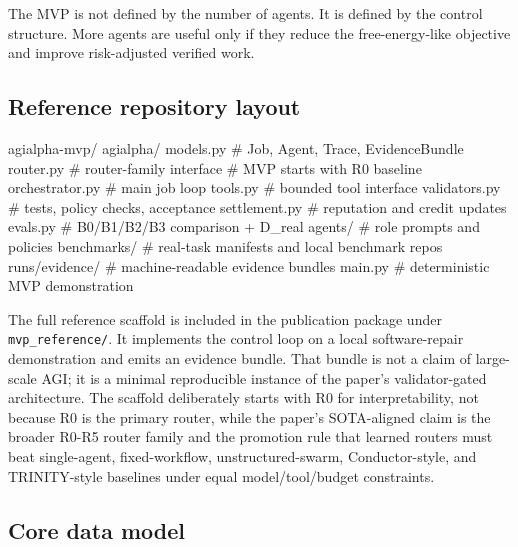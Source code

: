 \documentclass[
  11pt,
]{article}
\newenvironment{Shaded}{}{}
\newcommand{\NormalTok}[1]{#1}
\begin{document}
The MVP is not defined by the number of agents. It is defined by the
control structure. More agents are useful only if they reduce the
free-energy-like objective and improve risk-adjusted verified work.

\subsection{Reference repository
layout}\label{reference-repository-layout}

\begin{Shaded}
\begin{Highlighting}[]
\NormalTok{agialpha{-}mvp/}
\NormalTok{  agialpha/}
\NormalTok{    models.py          \# Job, Agent, Trace, EvidenceBundle}
\NormalTok{    router.py          \# router{-}family interface}
\NormalTok{                       \# MVP starts with R0 baseline}
\NormalTok{    orchestrator.py    \# main job loop}
\NormalTok{    tools.py           \# bounded tool interface}
\NormalTok{    validators.py      \# tests, policy checks, acceptance}
\NormalTok{    settlement.py      \# reputation and credit updates}
\NormalTok{    evals.py           \# B0/B1/B2/B3 comparison + D\_real}
\NormalTok{  agents/              \# role prompts and policies}
\NormalTok{  benchmarks/          \# real{-}task manifests and local benchmark repos}
\NormalTok{  runs/evidence/       \# machine{-}readable evidence bundles}
\NormalTok{  main.py              \# deterministic MVP demonstration}
\end{Highlighting}
\end{Shaded}

The full reference scaffold is included in the publication package under
\texttt{mvp\_reference/}. It implements the control loop on a local
software-repair demonstration and emits an evidence bundle. That bundle
is not a claim of large-scale AGI; it is a minimal reproducible instance
of the paper's validator-gated architecture. The scaffold deliberately
starts with R0 for interpretability, not because R0 is the primary
router, while the paper's SOTA-aligned claim is the broader R0-R5 router
family and the promotion rule that learned routers must beat
single-agent, fixed-workflow, unstructured-swarm, Conductor-style, and
TRINITY-style baselines under equal model/tool/budget constraints.

\subsection{Core data model}\label{core-data-model}
\end{document}
